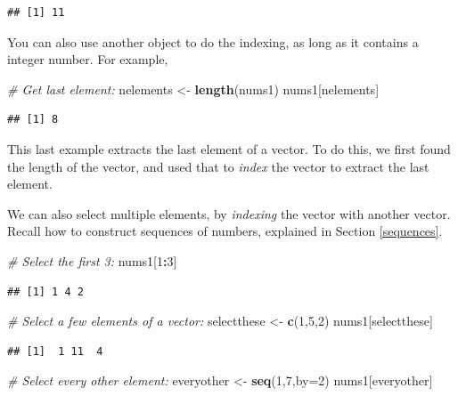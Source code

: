 \documentclass[]{book}
\newenvironment{Shaded}{\begin{snugshade}}{\end{snugshade}}
\newcommand{\CommentTok}[1]{\textcolor[rgb]{0.56,0.35,0.01}{\textit{#1}}}
\newcommand{\DataTypeTok}[1]{\textcolor[rgb]{0.13,0.29,0.53}{#1}}
\newcommand{\DecValTok}[1]{\textcolor[rgb]{0.00,0.00,0.81}{#1}}
\newcommand{\KeywordTok}[1]{\textcolor[rgb]{0.13,0.29,0.53}{\textbf{#1}}}
\newcommand{\NormalTok}[1]{#1}
\newcommand{\OperatorTok}[1]{\textcolor[rgb]{0.81,0.36,0.00}{\textbf{#1}}}
\newcommand{\StringTok}[1]{\textcolor[rgb]{0.31,0.60,0.02}{#1}}
\begin{document}
\begin{verbatim}
## [1] 11
\end{verbatim}

You can also use another object to do the indexing, as long as it contains a integer number. For example,

\begin{Shaded}
\begin{Highlighting}[]
\CommentTok{# Get last element:}
\NormalTok{nelements <-}\StringTok{ }\KeywordTok{length}\NormalTok{(nums1)}
\NormalTok{nums1[nelements]}
\end{Highlighting}
\end{Shaded}

\begin{verbatim}
## [1] 8
\end{verbatim}

This last example extracts the last element of a vector. To do this, we first found the length of the vector, and used that to \emph{index} the vector to extract the last element.

We can also select multiple elements, by \emph{indexing} the vector with another vector. Recall how to construct sequences of numbers, explained in Section \ref{sequences}.

\begin{Shaded}
\begin{Highlighting}[]
\CommentTok{# Select the first 3:}
\NormalTok{nums1[}\DecValTok{1}\OperatorTok{:}\DecValTok{3}\NormalTok{]}
\end{Highlighting}
\end{Shaded}

\begin{verbatim}
## [1] 1 4 2
\end{verbatim}

\begin{Shaded}
\begin{Highlighting}[]
\CommentTok{# Select a few elements of a vector:}
\NormalTok{selectthese <-}\StringTok{ }\KeywordTok{c}\NormalTok{(}\DecValTok{1}\NormalTok{,}\DecValTok{5}\NormalTok{,}\DecValTok{2}\NormalTok{)}
\NormalTok{nums1[selectthese]}
\end{Highlighting}
\end{Shaded}

\begin{verbatim}
## [1]  1 11  4
\end{verbatim}

\begin{Shaded}
\begin{Highlighting}[]
\CommentTok{# Select every other element:}
\NormalTok{everyother <-}\StringTok{ }\KeywordTok{seq}\NormalTok{(}\DecValTok{1}\NormalTok{,}\DecValTok{7}\NormalTok{,}\DataTypeTok{by=}\DecValTok{2}\NormalTok{)}
\NormalTok{nums1[everyother]}
\end{Highlighting}
\end{Shaded}
\end{document}
